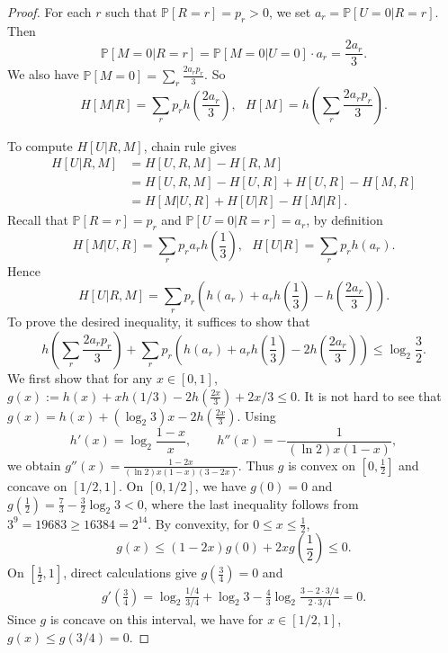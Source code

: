 \documentclass[10pt,a4paper]{amsart}
\newtheorem{comment}{Comment}
\begin{document}
\begin{proof}
For each $r$ such that $\mathbb{P}[R=r]=p_r>0$, we set $a_r=\mathbb{P}[U=0|R=r]$. Then 
$$\mathbb{P}[M=0|R=r]=\mathbb{P}[M=0|U=0] \cdot a_r = \frac{2a_r}{3}.$$
We also have $\mathbb{P}[M=0]=\sum_r \frac{2a_r p_r}{3}$. So 
$$H[M|R]=\sum_r p_r h\left(\frac{2a_r}{3}\right),~~~H[M]=h\left(\sum_r\frac{2a_rp_r}{3}\right).$$ 

To compute $H[U|R, M]$, chain rule gives
\begin{align*}
    H[U|R,M]&=H[U,R,M]-H[R,M]\\
            &=H[U,R,M]-H[U,R]+H[U,R]-H[M,R]\\
            &=H[M|U,R]+H[U|R]-H[M|R].
\end{align*}
Recall that $\mathbb{P}[R=r]=p_r$ and $\mathbb{P}[U=0|R=r]=a_r$, by definition
$$
    H[M|U,R]=\sum_r p_r a_r h\left(\frac{1}{3}\right),~~~H[U|R]=\sum_r p_r h(a_r).
$$
Hence $$H[U|R,M]=\sum_r p_r \left(h(a_r)+a_rh\left(\frac{1}{3}\right)-h\left(\frac{2a_r}{3}\right)\right).$$
To prove the desired inequality, it suffices to show that
$$h\left(\sum_r\frac{2a_rp_r}{3}\right)+\sum_r p_r \left(h(a_r)+a_rh\left(\frac{1}{3}\right)-2h\left(\frac{2a_r}{3}\right)\right) \le \log_2 \frac{3}{2}.$$
We first show that for any $x \in [0,1]$, $g(x):=h(x)+xh(1/3)-2h(\frac{2x}{3})+2x/3 \le 0$. It is not hard to see that $g(x)=h(x)+(\log_2 3) x-2h(\frac{2x}{3})$. Using
$$h'(x)=\log_2\frac{1-x}{x}, \qquad h''(x)=-\frac{1}{(\ln2)x(1-x)},$$
we obtain $g''(x)=\frac{1-2x}{(\ln2)x(1-x)(3-2x)}.$
Thus $g$ is convex on $[0,\frac{1}{2}]$ and concave on $[1/2,1]$. On $[0,1/2]$, we have $g(0)=0$ and $g\left(\frac12\right)
=\frac73-\frac32\log_2 3<0$,
where the last inequality follows from $3^9=19683 \ge 16384=2^{14}$. By convexity, for $0\le x\le  \frac{1}{2}$,
$$g(x)\le (1-2x)g(0)+2x g\left(\frac12\right)\le0.$$
On $[\frac{1}{2},1]$, direct calculations give $g\left(\frac34\right)=0$
and
\begin{align*}
g'\left(\frac34\right)=\log_2\frac{1/4}{3/4}+\log_2 3
-\frac43\log_2\frac{3-2 \cdot 3/4}{2 \cdot 3/4}=0.
\end{align*}
Since $g$ is concave on this interval, we have for $x \in [1/2, 1]$, $g(x) \le g(3/4) =0.$



\end{proof}
\end{document}
